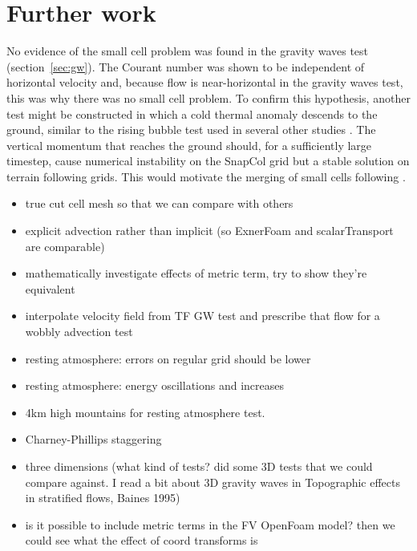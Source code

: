 \chapter{Further work}

No  evidence of the small cell problem was found in the gravity waves test (section~\ref{sec:gw}).  The Courant number was shown to be independent of horizontal velocity and, because flow is near-horizontal in the gravity waves test, this was why there was no small cell problem.  To confirm this hypothesis, another test might be constructed in which a cold thermal anomaly descends to the ground, similar to the rising bubble test used in several other studies \parencites{bonaventura2000}{jebens2011}{good2013}.  The vertical momentum that reaches the ground should, for a sufficiently large timestep, cause numerical instability on the SnapCol grid but a stable solution on terrain following grids.  This would motivate the merging of small cells following \textcite{yamazaki-satomura2010}.

\begin{itemize}
\item true cut cell mesh so that we can compare with others
\item explicit advection rather than implicit (so ExnerFoam and scalarTransport are comparable)
\item mathematically investigate effects of metric term, try to show they're equivalent
\item interpolate velocity field from TF GW test and prescribe that flow for a wobbly advection test
\item resting atmosphere: errors on regular grid should be lower
\item resting atmosphere: energy oscillations and increases
\item 4km high mountains for resting atmosphere test.
\item Charney-Phillips staggering
\item three dimensions (what kind of tests?  \textcite{lock2012} did some 3D tests that we could compare against.  I read a bit about 3D gravity waves in Topographic effects in stratified flows, Baines 1995) 
\item is it possible to include metric terms in the FV OpenFoam model?  then we could see what the effect of coord transforms is
\end{itemize}
